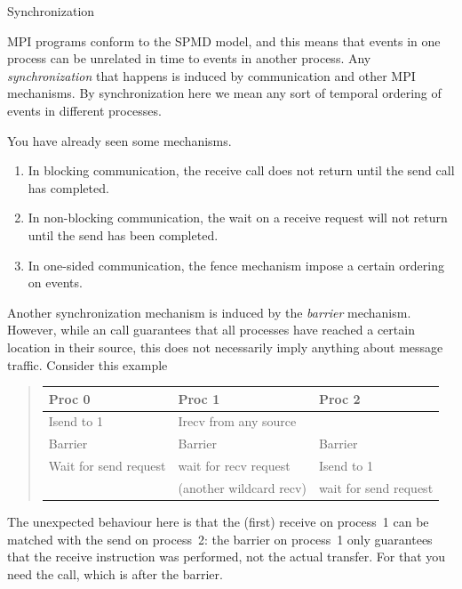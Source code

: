 
 {Synchronization}

MPI programs conform to the \ac{SPMD} model, and this means that events
in one process can be unrelated in time to events in another process.
Any \emph{synchronization} that happens is induced by communication 
and other MPI mechanisms. By synchronization here we mean any sort of
temporal ordering of events in different processes.

You have already seen some mechanisms.
\begin{enumerate}
\item In blocking communication, the receive call does not return until the send call has completed.
\item In non-blocking communication, the wait on a receive request will not return 
  until the send has been completed.
\item In one-sided communication, the fence mechanism impose a certain ordering on events.
\end{enumerate}

Another synchronization mechanism is induced by the \emph{barrier}
mechanism. However, while an  call guarantees that all processes have
reached a certain location in their source, this does not necessarily imply anything about 
message traffic. Consider this example
\begin{quotation}
  \begin{tabular}{|l|l|l|}
    \hline
    Proc 0 & Proc 1 & Proc 2\\
    \hline
    Isend to 1 & Irecv from any source & \\
    Barrier    & Barrier               & Barrier \\
    Wait for send request & wait for recv request & Isend to 1 \\
                          & (another wildcard recv) & wait for send request \\
    \hline
  \end{tabular}
\end{quotation}
The unexpected behaviour here is that the (first) receive on process~1
can be matched with the send on process~2: the barrier on process~1 only guarantees that the 
receive instruction was performed, not the actual transfer. For that you need the 
call, which is after the barrier.

